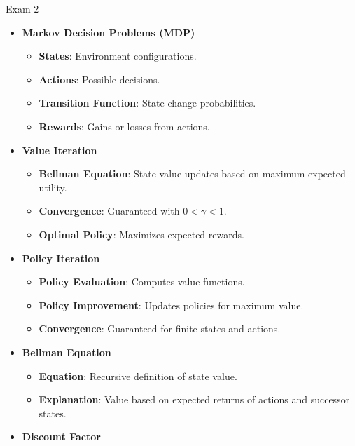 \begin{examnotes}{Exam 2}
\begin{highlight}
        \begin{itemize}
            \item \textbf{Markov Decision Problems (MDP)}
                \begin{itemize}
                    \item \textbf{States}: Environment configurations.
                    \item \textbf{Actions}: Possible decisions.
                    \item \textbf{Transition Function}: State change probabilities.
                    \item \textbf{Rewards}: Gains or losses from actions.
                \end{itemize}
            \item \textbf{Value Iteration}
                \begin{itemize}
                    \item \textbf{Bellman Equation}: State value updates based on maximum expected utility.
                    \item \textbf{Convergence}: Guaranteed with \(0 < \gamma < 1\).
                    \item \textbf{Optimal Policy}: Maximizes expected rewards.
                \end{itemize}
            \item \textbf{Policy Iteration}
                \begin{itemize}
                    \item \textbf{Policy Evaluation}: Computes value functions.
                    \item \textbf{Policy Improvement}: Updates policies for maximum value.
                    \item \textbf{Convergence}: Guaranteed for finite states and actions.
                \end{itemize}
            \item \textbf{Bellman Equation}
                \begin{itemize}
                    \item \textbf{Equation}: Recursive definition of state value.
                    \item \textbf{Explanation}: Value based on expected returns of actions and successor states.
                \end{itemize}
            \item \textbf{Discount Factor}
                \begin{itemize}

\end{itemize}
\end{itemize}
\end{highlight}
\end{examnotes}
